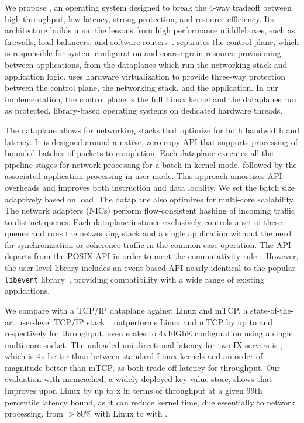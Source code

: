We propose \ix, an operating system designed to break the $4$-way
tradeoff between high throughput, low latency, strong protection, and
resource efficiency. Its architecture builds upon the lessons from
high performance middleboxes, such as firewalls, load-balancers, and
software routers~\cite{routebricks,click}. \ix separates the control
plane, which is responsible for system configuration and coarse-grain
resource provisioning between applications, from the dataplanes which
run the networking stack and application logic. \ix uses hardware
virtualization %
to provide three-way protection between the control plane, the
networking stack, and the application. In our implementation, the
control plane is the full Linux kernel and the dataplanes run as
protected, library-based operating systems on dedicated hardware
threads.

The \ix dataplane allows for networking stacks that optimize for both
bandwidth and latency. It is designed around a native, zero-copy API
that supports processing of bounded batches of packets to
completion. Each dataplane executes all the pipeline stages for
network processing for a batch in kernel mode, followed by the
associated application processing in user mode. This approach
amortizes API overheads and improves both instruction and data
locality. We set the batch size adaptively based on load. The \ix
dataplane also optimizes for multi-core scalability.  The network
adapters (NICs) perform flow-consistent hashing of incoming traffic to
distinct queues. Each dataplane instance exclusively controls a set of
these queues and runs the networking stack and a single application
without the need for synchronization or coherence traffic in the
common case operation. The \ix API departs from the POSIX API in order
to meet the commutativity rule~\cite{DBLP:conf/sosp/ClementsKZMK13}.
However, the \ix user-level library includes an event-based API nearly
identical to the popular \texttt{libevent}
library~\cite{provos2003libevent}, providing compatibility with a wide
range of existing applications.

We compare \ix with a TCP/IP dataplane against Linux
 and mTCP, a state-of-the-art user-level TCP/IP
stack~\cite{jeong2014mtcp}.  \ix outperforms Linux and mTCP by up to
 and  respectively for throughput. \ix
even scales to 4x10GbE configuration using a single multi-core socket.
The unloaded uni-directional latency for two IX servers is
\microsecond, which is 4x better than between standard
Linux kernels and an order of magnitude better than mTCP, as both
trade-off latency for throughput.  Our evaluation with memcached, a
widely deployed key-value store, shows that \ix improves upon Linux by
up to x in terms of throughput at a given 99th
percentile latency bound, as it can reduce kernel time, due
essentially to network processing, from $>80\%$ with Linux to
 with \ix.

